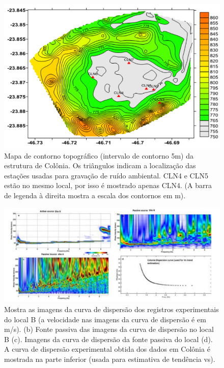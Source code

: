 \documentclass[smallextended]{svjour3}       %
\begin{document}
\begin{figure}[!hbtp]
  \begin{center}
  
  \includegraphics[scale=0.7]{Figures/fig3.png}
  \end{center}
  \caption{Mapa de contorno topográfico (intervalo de contorno 5m) da estrutura de Colônia. Os triângulos indicam a localização das estações usadas para gravação de ruído ambiental. CLN4 e CLN5 estão no mesmo local, por isso é mostrado apenas CLN4. (A barra de legenda à direita mostra a escala dos contornos em m).}
  \label{stations}
\end{figure}

\begin{figure}[!hbtp]
  \begin{center}
  
  \includegraphics[scale=0.6]{Figures/fig4.png}
  \end{center}
  \caption{Mostra as imagens da curva de dispersão dos registros experimentais do local B (a velocidade nas imagens da curva de dispersão é em m/s). (b) Fonte passiva das imagens da curva de dispersão no local B (c). Imagens da curva de dispersão da fonte passiva do local (d). A curva de dispersão experimental obtida dos dados em Colônia é mostrada na parte inferior (usada para estimativa de tendência vs).}
  \label{curva_disp}
\end{figure}
\end{document}
